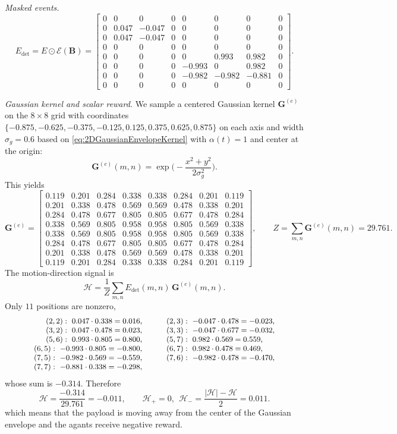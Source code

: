 \emph{Masked events.}
\[
E_{\mathrm{det}}=E\odot \mathcal{E}(\mathbf{B})=
\begin{bmatrix}
0&0&0&0&0&0&0&0\\
0&0.047&-0.047&0&0&0&0&0\\
0&0.047&-0.047&0&0&0&0&0\\
0&0&0&0&0&0&0&0\\
0&0&0&0&0&0.993&0.982&0\\
0&0&0&0&-0.993&0&0.982&0\\
0&0&0&0&-0.982&-0.982&-0.881&0\\
0&0&0&0&0&0&0&0
\end{bmatrix}.
\]

\emph{Gaussian kernel and scalar reward.}
We sample a centered Gaussian kernel $\mathbf{G}^{(e)}$ on the $8\times 8$ grid with coordinates
$\{-0.875,-0.625,-0.375,-0.125,0.125,0.375,0.625,0.875\}$ on each axis and width $\sigma_g=0.6$ based on \eqref{eq:2DGaussianEnvelopeKernel} with $\alpha(t)=1$ and center at the origin:
\[
\mathbf{G}^{(e)}(m,n)=\exp\!\Big(-\frac{x^2+y^2}{2\sigma_g^2}\Big).
\]
This yields
\[
\mathbf{G}^{(e)}=
\begin{bmatrix}
0.119&0.201&0.284&0.338&0.338&0.284&0.201&0.119\\
0.201&0.338&0.478&0.569&0.569&0.478&0.338&0.201\\
0.284&0.478&0.677&0.805&0.805&0.677&0.478&0.284\\
0.338&0.569&0.805&0.958&0.958&0.805&0.569&0.338\\
0.338&0.569&0.805&0.958&0.958&0.805&0.569&0.338\\
0.284&0.478&0.677&0.805&0.805&0.677&0.478&0.284\\
0.201&0.338&0.478&0.569&0.569&0.478&0.338&0.201\\
0.119&0.201&0.284&0.338&0.338&0.284&0.201&0.119
\end{bmatrix},\qquad
Z=\sum_{m,n}\mathbf{G}^{(e)}(m,n)=29.761.
\]
The motion-direction signal is
\[
\mathcal{H}=\frac{1}{Z}\sum_{m,n} E_{\mathrm{det}}(m,n)\,\mathbf{G}^{(e)}(m,n).
\]
Only $11$ positions are nonzero,
\[
\small
\begin{array}{rcl}
(2,2):\ 0.047\cdot 0.338=0.016,&\quad& (2,3):\ -0.047\cdot 0.478=-0.023,\\
(3,2):\ 0.047\cdot 0.478=0.023,&\quad& (3,3):\ -0.047\cdot 0.677=-0.032,\\
(5,6):\ 0.993\cdot 0.805=0.800,&\quad& (5,7):\ 0.982\cdot 0.569=0.559,\\
(6,5):\ -0.993\cdot 0.805=-0.800,&\quad& (6,7):\ 0.982\cdot 0.478=0.469,\\
(7,5):\ -0.982\cdot 0.569=-0.559,&\quad& (7,6):\ -0.982\cdot 0.478=-0.470,\\
(7,7):\ -0.881\cdot 0.338=-0.298,&&
\end{array}
\]
whose sum is $-0.314$. Therefore
\[
\mathcal{H}=\frac{-0.314}{29.761}=-0.011,\qquad
\mathcal{H}_{+}=0,\ \ \mathcal{H}_{-}=\frac{|\mathcal{H}|-\mathcal{H}}{2}=0.011.
\]
which means that the payload is moving away from the center of the Gaussian envelope and the agants receive negative reward.

